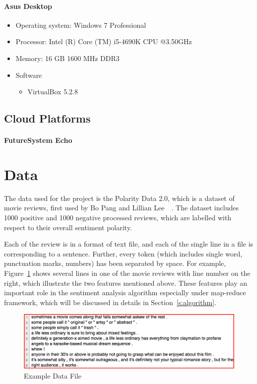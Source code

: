 \paragraph{Asus Desktop}
\begin{itemize}
	\item Operating system: Windows 7 Professional
	\item Processor: Intel (R) Core (TM) i5-4690K CPU @3.50GHz
	\item Memory: 16 GB 1600 MHz DDR3
	\item Software
	\begin{itemize}
		\item VirtualBox 5.2.8
	\end{itemize}
\end{itemize}

\subsection{Cloud Platforms}
\paragraph{FutureSystem Echo}


\section{Data}\label{s:data}

The data used for the project is the Polarity Data 2.0, which is a
dataset of movie reviews, first used by Bo Pang and Lillian
Lee~\cite{hid-sp18-405-sentiment-pang2004asentimental}~\cite{hid-sp18-405-sentiment-pang2002thumbs}.
The dataset includes 1000 positive and 1000 negative processed
reviews, which are labelled with respect to their overall sentiment
polarity.

Each of the review is in a format of text file, and each of the single
line in a file is corresponding to a sentence. Further, every token
(which includes single word, punctuation marks, numbers) has been
separated by space. For example, Figure~\ref{f:data} shows several
lines in one of the movie reviews with line number on the right, which
illustrate the two features mentioned above. These features play an
important role in the sentiment analysis algorithm especially under
map-reduce framework, which will be discussed in details in
Section~\ref{s:algorithm}.
\begin{figure}[!ht]
	\centering\includegraphics[width=\columnwidth]{images/polarity-data.png}
	\caption{Example Data File}\label{f:data}
\end{figure}


